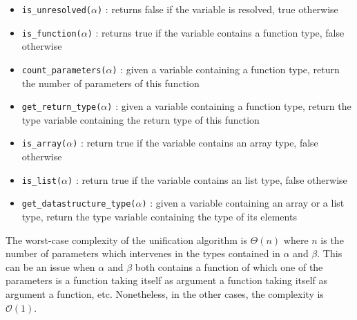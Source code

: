\documentclass[a4paper,11pt]{article}
\begin{document}
\begin{itemize}
	\item \texttt{is\_unresolved($\alpha$)} : returns false if the variable is resolved, true otherwise
	\item \texttt{is\_function($\alpha$)} : returns true if the variable contains a function type, false otherwise
	\item \texttt{count\_parameters($\alpha$)} : given a variable containing a function type, return the number of parameters of this function
	\item \texttt{get\_return\_type($\alpha$)} : given a variable containing a function type, return the type variable containing the return type of this function
	\item \texttt{is\_array($\alpha$)} : return true if the variable contains an array type, false otherwise
	\item \texttt{is\_list($\alpha$)} : return true if the variable contains an list type, false otherwise
	\item \texttt{get\_datastructure\_type($\alpha$)} : given a variable containing an array or a list type, return the type variable containing the type of its elements
\end{itemize}
The worst-case complexity of the unification algorithm is $\Theta(n)$ where $n$ is the number of parameters which intervenes in the types contained in $\alpha$ and $\beta$. This can be an issue when $\alpha$ and $\beta$ both contains a function of which one of the parameters is a function taking itself as argument a function taking itself as argument a function, etc. Nonetheless, in the other cases, the complexity is $\mathcal{O}(1)$.
\end{document}
